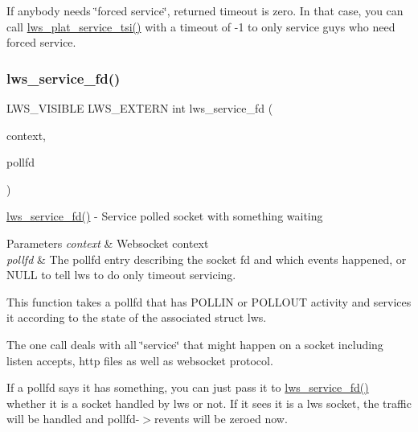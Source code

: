 If anybody needs \char`\"{}forced service\char`\"{}, returned timeout is zero. In that case, you can call \hyperlink{group__service_gab1ff2c19455268fa0d5b617d8057fbfc}{lws\+\_\+plat\+\_\+service\+\_\+tsi()} with a timeout of -\/1 to only service guys who need forced service. \mbox{\label{group__service_gad82efa5466d14a9f05aa06416375b28d}} 
\subsubsection{\texorpdfstring{lws\+\_\+service\+\_\+fd()}{lws\_service\_fd()}}
{\footnotesize\ttfamily L\+W\+S\+\_\+\+V\+I\+S\+I\+B\+LE L\+W\+S\+\_\+\+E\+X\+T\+E\+RN int lws\+\_\+service\+\_\+fd (\begin{DoxyParamCaption}\item[{struct \hyperlink{structlws__context}{lws\+\_\+context} $\ast$}]{context,  }\item[{struct lws\+\_\+pollfd $\ast$}]{pollfd }\end{DoxyParamCaption})}

\hyperlink{group__service_gad82efa5466d14a9f05aa06416375b28d}{lws\+\_\+service\+\_\+fd()} -\/ Service polled socket with something waiting 
\begin{DoxyParams}{Parameters}
{\em context} & Websocket context \\
\hline
{\em pollfd} & The pollfd entry describing the socket fd and which events happened, or N\+U\+LL to tell lws to do only timeout servicing.\\
\hline
\end{DoxyParams}
This function takes a pollfd that has P\+O\+L\+L\+IN or P\+O\+L\+L\+O\+UT activity and services it according to the state of the associated struct lws.

The one call deals with all \char`\"{}service\char`\"{} that might happen on a socket including listen accepts, http files as well as websocket protocol.

If a pollfd says it has something, you can just pass it to \hyperlink{group__service_gad82efa5466d14a9f05aa06416375b28d}{lws\+\_\+service\+\_\+fd()} whether it is a socket handled by lws or not. If it sees it is a lws socket, the traffic will be handled and pollfd-\/$>$revents will be zeroed now.

